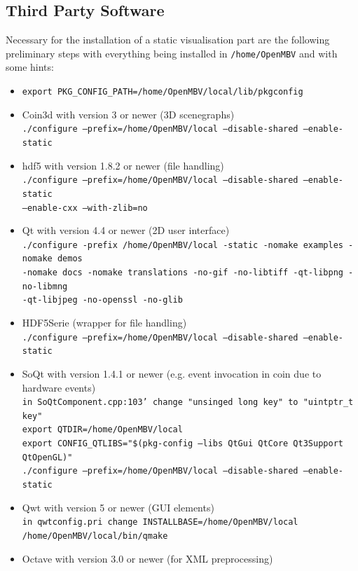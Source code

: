 \subsection{Third Party Software}\label{sec:third_party}
Necessary for the installation of a static visualisation part are the following preliminary steps with everything being installed in \texttt{/home/OpenMBV} and with some hints:
\begin{itemize}
\item \texttt{export PKG\_CONFIG\_PATH=/home/OpenMBV/local/lib/pkgconfig}
\item Coin3d with version 3 or newer (3D scenegraphs)\\
    \texttt{./configure --prefix=/home/OpenMBV/local --disable-shared --enable-static}
\item hdf5 with version 1.8.2 or newer (file handling)\\
    \texttt{./configure --prefix=/home/OpenMBV/local --disable-shared --enable-static\\ --enable-cxx --with-zlib=no}
\item Qt with version 4.4 or newer (2D user interface)\\
    \texttt{./configure -prefix /home/OpenMBV/local -static -nomake examples -nomake demos\\ -nomake docs -nomake translations -no-gif -no-libtiff -qt-libpng -no-libmng\\ -qt-libjpeg -no-openssl -no-glib}
\item HDF5Serie (wrapper for file handling)\\
    \texttt{./configure --prefix=/home/OpenMBV/local --disable-shared --enable-static}
\item SoQt with version 1.4.1 or newer (e.g. event invocation in coin due to hardware events)\\
    \texttt{in SoQtComponent.cpp:103' change "unsinged long key" to "uintptr\_t key"}\\
    \texttt{export QTDIR=/home/OpenMBV/local}\\
    \texttt{export CONFIG\_QTLIBS="\$(pkg-config --libs QtGui QtCore Qt3Support QtOpenGL)"}\\
    \texttt{./configure --prefix=/home/OpenMBV/local --disable-shared --enable-static}
\item Qwt with version 5 or newer (GUI elements)\\
    \texttt{in qwtconfig.pri change INSTALLBASE=/home/OpenMBV/local}\\
    \texttt{/home/OpenMBV/local/bin/qmake}
\item Octave with version 3.0 or newer (for XML preprocessing) 
\end{itemize}

